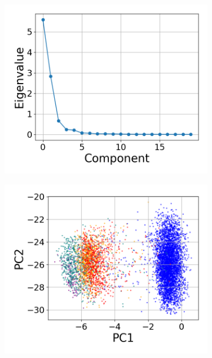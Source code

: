 \documentclass{article} %
\begin{document}
\begin{figure}[t]
\centering

\begin{subfigure}{0.182\textwidth}
    \includegraphics[width=\linewidth]{images/eigenvalue-decay.png}
    \caption{}
\end{subfigure}\hfill
\begin{subfigure}{0.182\textwidth}
    \includegraphics[width=\linewidth]{images/pca-components.png}
    \caption{}
\end{subfigure}\hfill

\end{figure}
\end{document}
